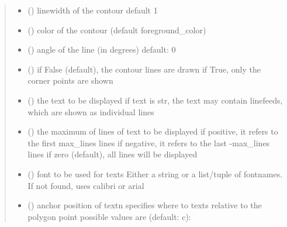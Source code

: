 \documentclass[letterpaper,10pt,english]{sphinxmanual}
\begin{document}
\begin{fulllineitems}
\begin{quote}
\begin{description}
\begin{itemize}
\item {} 
 () \textendash{} linewidth of the contour 
default 1

\item {} 
 () \textendash{} color of the contour (default foreground\_color)

\item {} 
 () \textendash{} angle of the line (in degrees) 
default: 0

\item {} 
 () \textendash{} if False (default), the contour lines are drawn 
if True, only the corner points are shown

\item {} 
 (\sphinxstyleliteralemphasis{\sphinxupquote{, }}) \textendash{} the text to be displayed 
if text is str, the text may contain linefeeds, which are shown as individual lines

\item {} 
 () \textendash{} the maximum of lines of text to be displayed 
if positive, it refers to the first max\_lines lines 
if negative, it refers to the last -max\_lines lines 
if zero (default), all lines will be displayed

\item {} 
 () \textendash{} font to be used for texts 
Either a string or a list/tuple of fontnames.
If not found, uses calibri or arial

\item {} 
 () \textendash{} anchor position of text\textbar{}n\textbar{}
specifies where to texts relative to the polygon
point 
possible values are (default: c): 


\end{itemize}
\end{description}
\end{quote}
\end{fulllineitems}
\end{document}
